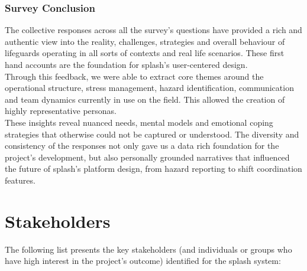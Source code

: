 \subsubsection{\textbf{Survey Conclusion}}
The collective responses across all the survey's questions have provided a rich and authentic view into the reality, challenges, strategies and overall behaviour of lifeguards operating in all sorts of contexts and real life scenarios. These first hand accounts are the foundation for \ac{splash}'s user-centered design.
\\
Through this feedback, we were able to extract core themes around the operational structure, stress management, hazard identification, communication and team dynamics currently in use on the field. This allowed the creation of highly representative personas. 
\\
These insights reveal nuanced needs, mental models and emotional coping strategies that otherwise could not be captured or understood. The diversity and consistency of the responses not only gave us a data rich foundation for the project's development, but also personally grounded narratives that influenced the future of \ac{splash}'s platform design, from hazard reporting to shift coordination features.

\section{Stakeholders}
\label{section:stakeholders} 
The following list presents the key stakeholders (and individuals or groups who have high interest in the project’s outcome) identified for the \ac{splash} system: 

